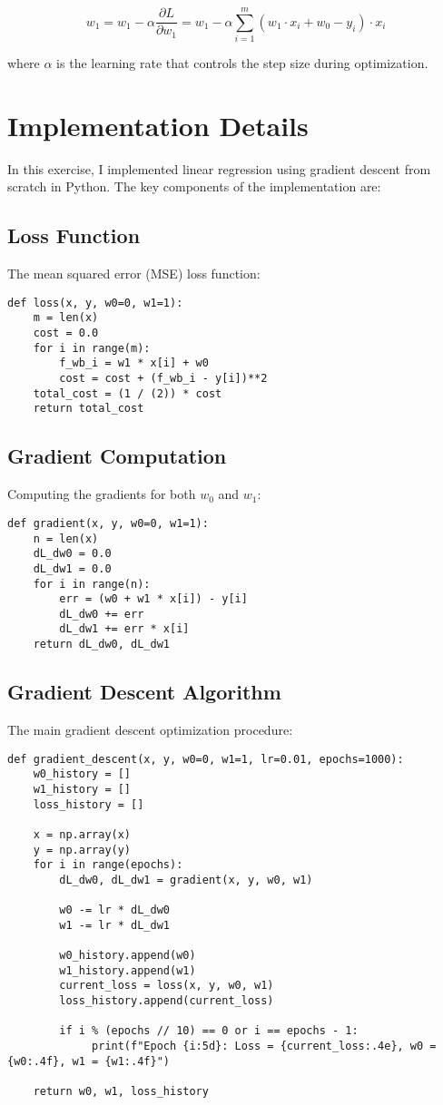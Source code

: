 \documentclass[hidelinks]{report}
\begin{document}
\begin{equation}
w_1 = w_1 - \alpha \frac{\partial L}{\partial w_1} = w_1 - \alpha \sum_{i=1}^{m} (w_1 \cdot x_i + w_0 - y_i) \cdot x_i
\end{equation}

\noindent where $\alpha$ is the learning rate that controls the step size during optimization.

\section{Implementation Details}
\noindent In this exercise, I implemented linear regression using gradient descent from scratch in Python. The key components of the implementation are:

\subsection{Loss Function}
\noindent The mean squared error (MSE) loss function:

\begin{verbatim}
def loss(x, y, w0=0, w1=1):
    m = len(x)
    cost = 0.0
    for i in range(m):
        f_wb_i = w1 * x[i] + w0
        cost = cost + (f_wb_i - y[i])**2
    total_cost = (1 / (2)) * cost
    return total_cost
\end{verbatim}

\subsection{Gradient Computation}
\noindent Computing the gradients for both $w_0$ and $w_1$:

\begin{verbatim}
def gradient(x, y, w0=0, w1=1):
    n = len(x)
    dL_dw0 = 0.0
    dL_dw1 = 0.0
    for i in range(n):
        err = (w0 + w1 * x[i]) - y[i]
        dL_dw0 += err
        dL_dw1 += err * x[i]
    return dL_dw0, dL_dw1
\end{verbatim}

\subsection{Gradient Descent Algorithm}
\noindent The main gradient descent optimization procedure:

\begin{verbatim}
def gradient_descent(x, y, w0=0, w1=1, lr=0.01, epochs=1000):
    w0_history = []
    w1_history = []
    loss_history = []

    x = np.array(x)
    y = np.array(y)
    for i in range(epochs):
        dL_dw0, dL_dw1 = gradient(x, y, w0, w1)
    
        w0 -= lr * dL_dw0
        w1 -= lr * dL_dw1
    
        w0_history.append(w0)
        w1_history.append(w1)
        current_loss = loss(x, y, w0, w1)
        loss_history.append(current_loss)
    
        if i % (epochs // 10) == 0 or i == epochs - 1:
             print(f"Epoch {i:5d}: Loss = {current_loss:.4e}, w0 = {w0:.4f}, w1 = {w1:.4f}")

    return w0, w1, loss_history
\end{verbatim}
\end{document}
